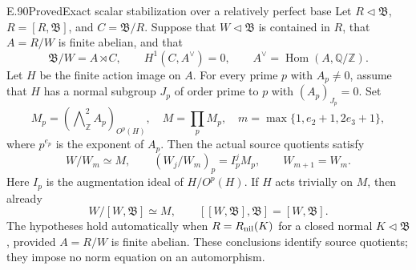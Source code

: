 \begin{result}{E.90}{Proved}{Exact scalar stabilization over a relatively perfect base}
Let \(R\triangleleft\mathfrak B\), \(R=[R,\mathfrak B]\), and
\(C=\mathfrak B/R\).  Suppose that \(W\triangleleft\mathfrak B\)
is contained in \(R\), that \(A=R/W\) is finite abelian, and that
\[
 \mathfrak B/W=A\rtimes C,\qquad
 H^1(C,A^\vee)=0,\qquad
 A^\vee=\operatorname{Hom}(A,\mathbb Q/\mathbb Z).
                                                        \tag{E.90.1}
\]
Let \(H\) be the finite action image on \(A\).  For every prime \(p\)
with \(A_p\ne0\), assume that \(H\) has a normal subgroup \(J_p\)
of order prime to \(p\) with \((A_p)_{J_p}=0\).  Set
\[
 M_p=(\bigwedge\nolimits^2_{\mathbb Z}A_p)_{O^p(H)},
 \quad M=\prod_pM_p,\quad
 m=\max\{1,e_2+1,2e_3+1\},
                                                        \tag{E.90.2}
\]
where \(p^{e_p}\) is the exponent of \(A_p\).
Then the actual source quotients satisfy
\[
 W/W_m\simeq M,\qquad
 (W_j/W_m)_p=I_p^jM_p,\qquad W_{m+1}=W_m.                \tag{E.90.3}
\]
Here \(I_p\) is the augmentation ideal of \(H/O^p(H)\).
If \(H\) acts trivially on \(M\), then already
\[
 W/[W,\mathfrak B]\simeq M,\qquad
 [[W,\mathfrak B],\mathfrak B]=[W,\mathfrak B].
                                                        \tag{E.90.4}
\]
The hypotheses hold automatically when
\(R=R_{\rm nil}(K)\) for a closed normal \(K\triangleleft\mathfrak B\),
provided \(A=R/W\) is finite abelian.  These conclusions identify
source quotients; they impose no norm equation on an automorphism.
\end{result}
